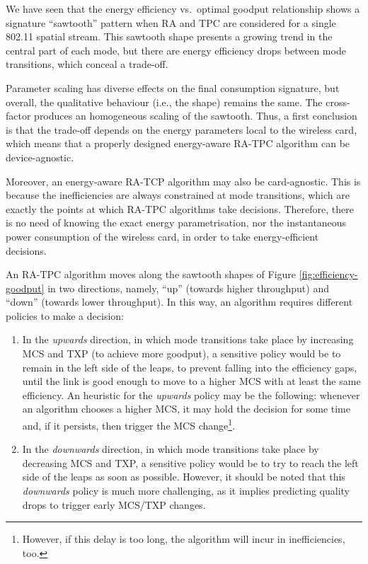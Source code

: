 \documentclass[twoside,nohyper]{tufte-book}
\providecommand{\tightlist}{%
  \setlength{\itemsep}{0pt}\setlength{\parskip}{0pt}}
\theoremstyle{definition}
\theoremstyle{definition}
\theoremstyle{definition}
\theoremstyle{remark}
\begin{document}
We have seen that the energy efficiency vs.~optimal goodput relationship
shows a signature ``sawtooth'' pattern when RA and TPC are considered
for a single 802.11 spatial stream. This sawtooth shape presents a
growing trend in the central part of each mode, but there are energy
efficiency drops between mode transitions, which conceal a trade-off.

Parameter scaling has diverse effects on the final consumption
signature, but overall, the qualitative behaviour (i.e., the shape)
remains the same. The cross-factor produces an homogeneous scaling of
the sawtooth. Thus, a first conclusion is that the trade-off depends on
the energy parameters local to the wireless card, which means that a
properly designed energy-aware RA-TPC algorithm can be device-agnostic.

Moreover, an energy-aware RA-TCP algorithm may also be card-agnostic.
This is because the inefficiencies are always constrained at mode
transitions, which are exactly the points at which RA-TPC algorithms
take decisions. Therefore, there is no need of knowing the exact energy
parametrisation, nor the instantaneous power consumption of the wireless
card, in order to take energy-efficient decisions.

An RA-TPC algorithm moves along the sawtooth shapes of Figure
\ref{fig:efficiency-goodput} in two directions, namely, ``up'' (towards
higher throughput) and ``down'' (towards lower throughput). In this way,
an algorithm requires different policies to make a decision:

\begin{enumerate}
\def\labelenumi{(\roman{enumi})}
\tightlist
\item
  In the \emph{upwards} direction, in which mode transitions take place
  by increasing MCS and TXP (to achieve more goodput), a sensitive
  policy would be to remain in the left side of the leaps, to prevent
  falling into the efficiency gaps, until the link is good enough to
  move to a higher MCS with at least the same efficiency. An heuristic
  for the \emph{upwards} policy may be the following: whenever an
  algorithm chooses a higher MCS, it may hold the decision for some time
  and, if it persists, then trigger the MCS change\footnote{However, if
    this delay is too long, the algorithm will incur in inefficiencies,
    too.}.
\item
  In the \emph{downwards} direction, in which mode transitions take
  place by decreasing MCS and TXP, a sensitive policy would be to try to
  reach the left side of the leaps as soon as possible. However, it
  should be noted that this \emph{downwards} policy is much more
  challenging, as it implies predicting quality drops to trigger early
  MCS/TXP changes.
\end{enumerate}
\end{document}
